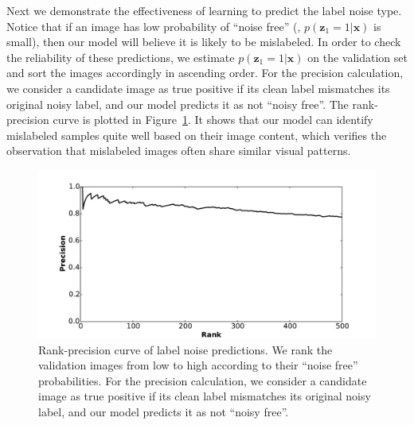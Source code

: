 \documentclass[10pt,twocolumn,letterpaper]{article}
\def\vec{\mathbf}
\begin{document}
Next we demonstrate the effectiveness of learning to predict the label noise type. Notice that if an image has low probability of ``noise free'' (\ie, $p(\vec{z}_1=1|\vec{x})$ is small), then our model will believe it is likely to be mislabeled. In order to check the reliability of these predictions, we estimate $p(\vec{z}_1=1|\vec{x})$ on the validation set and sort the images accordingly in ascending order. For the precision calculation, we consider a candidate image as true positive if its clean label mismatches its original noisy label, and our model predicts it as not ``noisy free''. The rank-precision curve is plotted in Figure~\ref{fig:noise_prediction_rp}. It shows that our model can identify mislabeled samples quite well based on their image content, which verifies the observation that mislabeled images often share similar visual patterns.

\begin{figure}[t]
\begin{center}
\includegraphics[width=1.0\linewidth]{figure/noise_prediction_rank_precision.pdf}
\end{center}
\caption{Rank-precision curve of label noise predictions. We rank the validation images from low to high according to their ``noise free'' probabilities. For the precision calculation, we consider a candidate image as true positive if its clean label mismatches its original noisy label, and our model predicts it as not ``noisy free''.}
\label{fig:noise_prediction_rp}
\end{figure}
\end{document}
